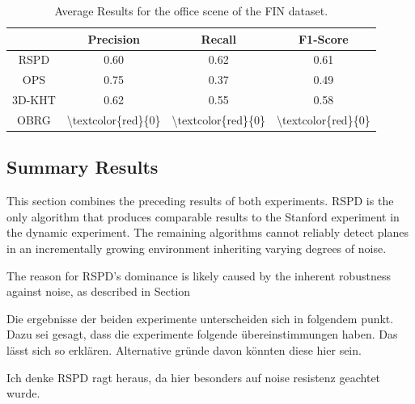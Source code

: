 \documentclass[main.tex]{subfiles}
\begin{document}
\begin{table}[]
    \centering
    \begin{tabular}{c|ccc}
               & Precision                             & Recall                                & F1-Score                              \\ \hline
        RSPD   & 0.60                                  & 0.62                                  & 0.61                                  \\
        OPS    & 0.75                                  & 0.37                                  & 0.49                                  \\
        3D-KHT & 0.62                                  & 0.55                                  & 0.58                                  \\
        OBRG   & \textbackslash{}textcolor\{red\}\{0\} & \textbackslash{}textcolor\{red\}\{0\} & \textbackslash{}textcolor\{red\}\{0\}
    \end{tabular}
    \caption{Average Results for the office scene of the FIN dataset.}
    \label{tab:res-fin-off}
\end{table}

\subsection{Summary Results}
This section combines the preceding results of both experiments.
RSPD is the only algorithm that produces comparable results to the Stanford experiment in the dynamic experiment.
The remaining algorithms cannot reliably detect planes in an incrementally growing environment inheriting varying degrees of noise.

The reason for RSPD's dominance is likely caused by the inherent robustness against noise, as described in Section~

Die ergebnisse der beiden experimente unterscheiden sich in folgendem punkt. Dazu sei gesagt, dass die experimente folgende übereinstimmungen haben.
Das lässt sich so erklären. Alternative gründe davon könnten diese hier sein.

Ich denke RSPD ragt heraus, da hier besonders auf noise resistenz geachtet wurde. %
\end{document}
